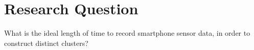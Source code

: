 \documentclass[12pt,a4paper]{article}
\begin{document}

















\section*{Research Question}
What is the ideal length of time to record smartphone sensor data, in order to construct distinct clusters?
\end{document}
